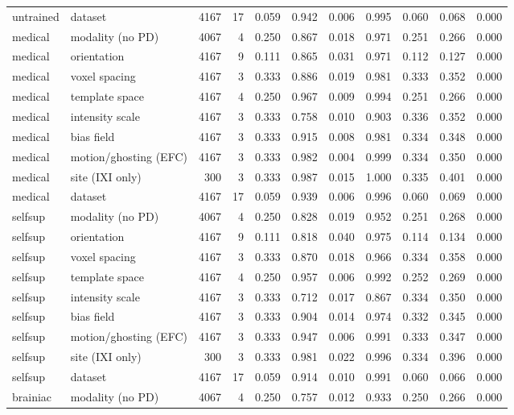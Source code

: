 \begin{tabular}{llrrrrrrrrr}
untrained & dataset & 4167 & 17 & 0.059 & 0.942 & 0.006 & 0.995 & 0.060 & 0.068 & 0.000 \\
medical & modality (no PD) & 4067 & 4 & 0.250 & 0.867 & 0.018 & 0.971 & 0.251 & 0.266 & 0.000 \\
medical & orientation & 4167 & 9 & 0.111 & 0.865 & 0.031 & 0.971 & 0.112 & 0.127 & 0.000 \\
medical & voxel spacing & 4167 & 3 & 0.333 & 0.886 & 0.019 & 0.981 & 0.333 & 0.352 & 0.000 \\
medical & template space & 4167 & 4 & 0.250 & 0.967 & 0.009 & 0.994 & 0.251 & 0.266 & 0.000 \\
medical & intensity scale & 4167 & 3 & 0.333 & 0.758 & 0.010 & 0.903 & 0.336 & 0.352 & 0.000 \\
medical & bias field & 4167 & 3 & 0.333 & 0.915 & 0.008 & 0.981 & 0.334 & 0.348 & 0.000 \\
medical & motion/ghosting (EFC) & 4167 & 3 & 0.333 & 0.982 & 0.004 & 0.999 & 0.334 & 0.350 & 0.000 \\
medical & site (IXI only) & 300 & 3 & 0.333 & 0.987 & 0.015 & 1.000 & 0.335 & 0.401 & 0.000 \\
medical & dataset & 4167 & 17 & 0.059 & 0.939 & 0.006 & 0.996 & 0.060 & 0.069 & 0.000 \\
selfsup & modality (no PD) & 4067 & 4 & 0.250 & 0.828 & 0.019 & 0.952 & 0.251 & 0.268 & 0.000 \\
selfsup & orientation & 4167 & 9 & 0.111 & 0.818 & 0.040 & 0.975 & 0.114 & 0.134 & 0.000 \\
selfsup & voxel spacing & 4167 & 3 & 0.333 & 0.870 & 0.018 & 0.966 & 0.334 & 0.358 & 0.000 \\
selfsup & template space & 4167 & 4 & 0.250 & 0.957 & 0.006 & 0.992 & 0.252 & 0.269 & 0.000 \\
selfsup & intensity scale & 4167 & 3 & 0.333 & 0.712 & 0.017 & 0.867 & 0.334 & 0.350 & 0.000 \\
selfsup & bias field & 4167 & 3 & 0.333 & 0.904 & 0.014 & 0.974 & 0.332 & 0.345 & 0.000 \\
selfsup & motion/ghosting (EFC) & 4167 & 3 & 0.333 & 0.947 & 0.006 & 0.991 & 0.333 & 0.347 & 0.000 \\
selfsup & site (IXI only) & 300 & 3 & 0.333 & 0.981 & 0.022 & 0.996 & 0.334 & 0.396 & 0.000 \\
selfsup & dataset & 4167 & 17 & 0.059 & 0.914 & 0.010 & 0.991 & 0.060 & 0.066 & 0.000 \\
brainiac & modality (no PD) & 4067 & 4 & 0.250 & 0.757 & 0.012 & 0.933 & 0.250 & 0.266 & 0.000 \\

\end{tabular}
